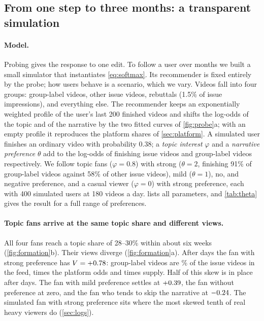 \subsection{From one step to three months: a transparent simulation}
\label{sec:sim}

\paragraph{Model.} Probing gives the response to one edit. To follow a user over months we built a small simulator that instantiates \cref{eq:softmax}. Its recommender is fixed entirely by the probe; how users behave is a scenario, which we vary. Videos fall into four groups: group-label videos, other issue videos, rebuttals (1.5\% of issue impressions), and everything else. The recommender keeps an exponentially weighted profile of the user's last 200 finished videos and shifts the log-odds of the topic and of the narrative by the two fitted curves of \cref{fig:probe}a; with an empty profile it reproduces the platform shares of \cref{sec:platform}. A simulated user finishes an ordinary video with probability 0.38; a \emph{topic interest} $\varphi$ and a \emph{narrative preference} $\theta$ add to the log-odds of finishing issue videos and group-label videos respectively. We follow topic fans ($\varphi=0.8$) with strong ($\theta=2$, finishing 91\% of group-label videos against 58\% of other issue videos), mild ($\theta=1$), no, and negative preference, and a casual viewer ($\varphi=0$) with strong preference, each with 400 simulated users at 180 videos a day.  lists all parameters, and \cref{tab:theta} gives the result for a full range of preferences.

\paragraph{Topic fans arrive at the same topic share and different views.} All four fans reach a topic share of 28--30\% within about six weeks (\cref{fig:formation}b). Their views diverge (\cref{fig:formation}a). After \nFormDays{} days the fan with strong preference has $V=+0.78$: group-label videos are \nShareStrong\% of the issue videos in the feed, \nOddsStrong{} times the platform odds and \nTotalOddsStrong{} times supply. Half of this skew is in place after \nFormHalfDays{} days. The fan with mild preference settles at $+0.39$, the fan without preference at zero, and the fan who tends to skip the narrative at $-0.24$. The simulated fan with strong preference sits where the most skewed tenth of real heavy viewers do (\cref{sec:logs}).

